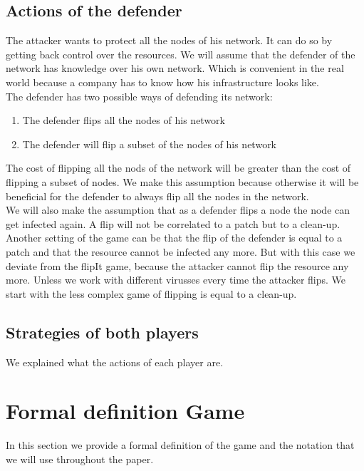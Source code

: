 \subsection{Actions of the defender}
The attacker wants to protect all the nodes of his network. It can do so by getting back control over the resources. We will assume that the defender of the network has knowledge over his own network. Which is convenient in the real world because a company has to know how his infrastructure looks like.\\

The defender has two possible ways of defending its network:
\begin{enumerate}
\item The defender flips all the nodes of his network
\item The defender will flip a subset of the nodes of his network
\end{enumerate}

The cost of flipping all the nods of the network will be greater than the cost of flipping a subset of nodes. We make this assumption because otherwise it will be beneficial for the defender to always flip all the nodes in the network.\\

We will also make the assumption that as a defender flips a node the node can get infected again. A flip will not be  correlated to a patch but to a clean-up. 
 Another setting of the game can be that the flip of the defender is equal to a patch and that the resource cannot be infected any more. But with this case we deviate from the flipIt game, because the attacker cannot flip the resource any more. Unless we work with different virusses every time the attacker flips. We start with the less complex game of flipping is equal to a clean-up.

\subsection{Strategies of both players}
We explained what the actions of each player are. 

\section{Formal definition Game}

In this section we provide a formal definition of the game and the notation that we will use throughout the paper. 
